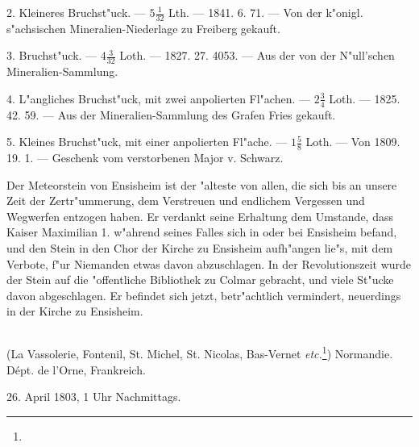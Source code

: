 \documentclass[a4paper, 11pt, oneside, polutonikogreek, german]{article}
\begin{document}
2. Kleineres Bruchst"uck. --- $5\frac{1}{32}$ Lth. --- 1841. 6. 71. --- Von der k"onigl. s"achsischen Mineralien-Niederlage zu Freiberg gekauft.

3. Bruchst"uck. --- $4\frac{3}{32}$ Loth. --- 1827. 27. 4053.
--- Aus der von der N"ull’schen Mineralien-Sammlung.

4. L"angliches Bruchst"uck, mit zwei anpolierten Fl"achen. --- $2\frac{3}{4}$ Loth. --- 1825. 42. 59. --- Aus der Mineralien-Sammlung des Grafen Fries gekauft.

5. Kleines Bruchst"uck, mit einer anpolierten Fl"ache. --- $1\frac{5}{8}$ Loth. --- Von 1809. 19. 1. --- Geschenk vom verstorbenen Major v. Schwarz.

\setlength{\leftskip}{10mm}
\setlength{\parindent}{0pt}

{\footnotesize Der Meteorstein von Ensisheim ist der "alteste von allen, die sich bis an unsere Zeit der Zertr"ummerung, dem Verstreuen und endlichem Vergessen und Wegwerfen entzogen haben. Er verdankt seine Erhaltung dem Umstande, dass Kaiser Maximilian 1. w"ahrend seines Falles sich in oder bei Ensisheim befand, und den Stein in den Chor der Kirche zu Ensisheim aufh"angen lie"s, mit dem Verbote, f"ur Niemanden etwas davon abzuschlagen. In der Revolutionszeit wurde der Stein auf die "offentliche Bibliothek zu Colmar gebracht, und viele St"ucke davon abgeschlagen. Er befindet sich jetzt, betr"achtlich vermindert, neuerdings in der Kirche zu Ensisheim.}

\setlength{\leftskip}{0pt}
\setlength{\parindent}{20pt}

\subsection{}
\begin{center}

(La Vassolerie, Fontenil, St. Michel, St. Nicolas, Bas-Vernet \emph{etc.}\footnote{}) Normandie. Dépt. de l'Orne, Frankreich.

26. April 1803, 1 Uhr Nachmittags.
\end{center}
\end{document}
